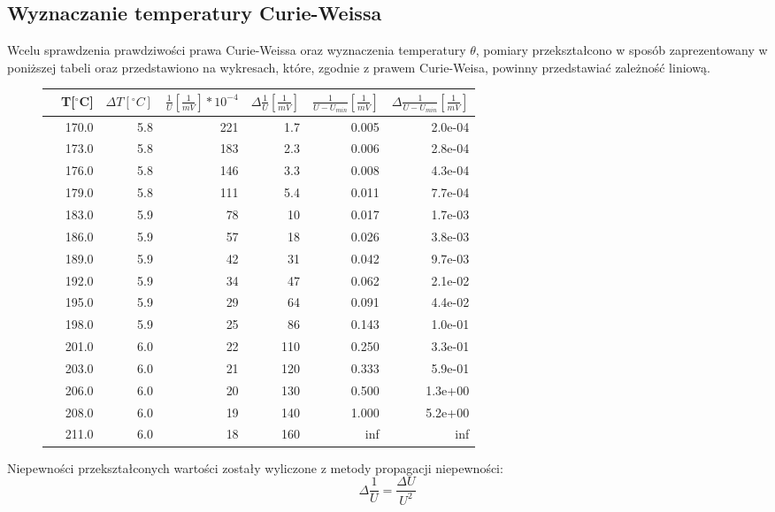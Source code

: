 \documentclass[a4paper,10pt]{article}
\begin{document}
\subsection{Wyznaczanie temperatury Curie-Weissa}
Wcelu sprawdzenia prawdziwości prawa Curie-Weissa oraz wyznaczenia temperatury $\theta$, pomiary przekształcono w sposób zaprezentowany w poniższej tabeli oraz przedstawiono na wykresach, które, zgodnie z prawem Curie-Weisa, powinny przedstawiać zależność liniową.
\begin{figure}
\begin{tabular}{lrrrrrr}
\toprule
{} &  T[$^\circ $C] &  $\Delta T [^\circ C]$ &  $\frac{1}{U}[\frac{1}{mV}]*10^{-4}$ &  $\Delta \frac{1}{U}[\frac{1}{mV}]$ &  $\frac{1}{U-U_{min}}[\frac{1}{mV}]$ &  $\Delta \frac{1}{U-U_{min}}[\frac{1}{mV}]$ \\
\midrule
& 170.0 &  5.8 & 221 & 1.7 & 0.005 &   2.0e-04 \\
& 173.0 &  5.8 & 183 & 2.3 & 0.006 &   2.8e-04 \\
& 176.0 &  5.8 & 146 & 3.3 & 0.008 &   4.3e-04 \\
& 179.0 &  5.8 & 111 & 5.4 & 0.011 &   7.7e-04 \\
& 183.0 &  5.9 &  78 & 10  & 0.017 &   1.7e-03 \\
& 186.0 &  5.9 &  57 & 18  & 0.026 &   3.8e-03 \\
& 189.0 &  5.9 &  42 & 31  & 0.042 &   9.7e-03 \\
& 192.0 &  5.9 &  34 & 47  & 0.062 &   2.1e-02 \\
& 195.0 &  5.9 &  29 & 64  & 0.091 &   4.4e-02 \\
& 198.0 &  5.9 &  25 & 86  & 0.143 &   1.0e-01 \\
& 201.0 &  6.0 &  22 & 110 & 0.250 &   3.3e-01 \\
& 203.0 &  6.0 &  21 & 120 & 0.333 &   5.9e-01 \\
& 206.0 &  6.0 &  20 & 130 & 0.500 &   1.3e+00 \\
& 208.0 &  6.0 &  19 & 140 & 1.000 &   5.2e+00 \\
& 211.0 &  6.0 &  18 & 160 &   inf &       inf \\
\bottomrule
\end{tabular}
\end{figure}
Niepewności przekształconych wartości zostały wyliczone z metody propagacji niepewności:
\begin{equation}
\Delta \frac{1}{U} = \frac{\Delta U}{U^2}
\end{equation}
\end{document}
